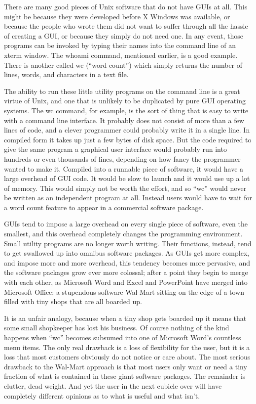 \documentclass[
  fontsize=11pt,
  paper=landscape,
  twocolumn=true,
  pagesize=pdftex,
  headings=small,
  DIV=15,
  ]{scrartcl}
\begin{document}
There are many good pieces of Unix software that do not have GUIs at
all. This might be because they were developed before X Windows was
available, or because the people who wrote them did not want to suffer
through all the hassle of creating a GUI, or because they simply do not
need one. In any event, those programs can be invoked by typing their
names into the command line of an xterm window. The whoami command,
mentioned earlier, is a good example. There is another called wc (``word
count'') which simply returns the number of lines, words, and characters
in a text file.

The ability to run these little utility programs on the command line is
a great virtue of Unix, and one that is unlikely to be duplicated by
pure GUI operating systems. The wc command, for example, is the sort of
thing that is easy to write with a command line interface. It probably
does not consist of more than a few lines of code, and a clever
programmer could probably write it in a single line. In compiled form it
takes up just a few bytes of disk space. But the code required to give
the same program a graphical user interface would probably run into
hundreds or even thousands of lines, depending on how fancy the
programmer wanted to make it. Compiled into a runnable piece of
software, it would have a large overhead of GUI code. It would be slow
to launch and it would use up a lot of memory. This would simply not be
worth the effort, and so ``wc'' would never be written as an independent
program at all. Instead users would have to wait for a word count
feature to appear in a commercial software package.

GUIs tend to impose a large overhead on every single piece of software,
even the smallest, and this overhead completely changes the programming
environment. Small utility programs are no longer worth writing. Their
functions, instead, tend to get swallowed up into omnibus software
packages. As GUIs get more complex, and impose more and more overhead,
this tendency becomes more pervasive, and the software packages grow
ever more colossal; after a point they begin to merge with each other,
as Microsoft Word and Excel and PowerPoint have merged into Microsoft
Office: a stupendous software Wal-Mart sitting on the edge of a town
filled with tiny shops that are all boarded up.

It is an unfair analogy, because when a tiny shop gets boarded up it
means that some small shopkeeper has lost his business. Of course
nothing of the kind happens when ``wc'' becomes subsumed into one of
Microsoft Word's countless menu items. The only real drawback is a loss
of flexibility for the user, but it is a loss that most customers
obviously do not notice or care about. The most serious drawback to the
Wal-Mart approach is that most users only want or need a tiny fraction
of what is contained in these giant software packages. The remainder is
clutter, dead weight. And yet the user in the next cubicle over will
have completely different opinions as to what is useful and what isn't.
\end{document}
